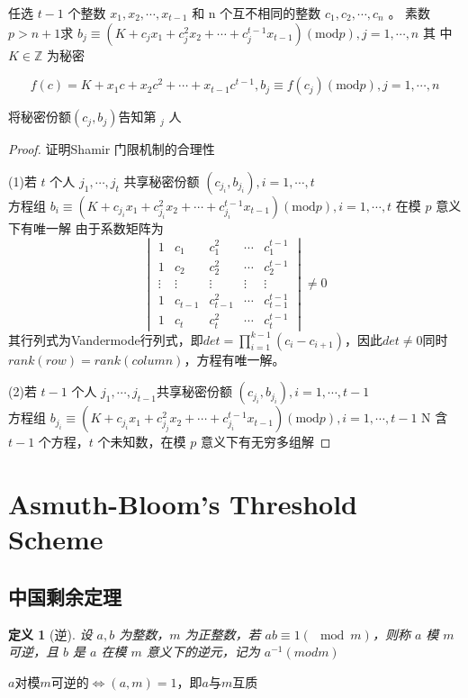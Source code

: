 \documentclass[12pt, a4paper, oneside]{ctexbook}
\newtheorem{definition}[theorem]{定义}
\begin{document}
任选 $t-1$ 个整数 $x_1,x_2,\cdots,x_{t-1}$ 和 n 个互不相同的整数 $c_1,c_2,\cdots,c_n$ 。
素数 $p>n+1$求 $b_j\equiv(K+c_jx_1+c_j^2x_2+\cdots+c_j^{t-1}x_{t-1})\left({\mathrm{mod}}p\right),j=1,\cdots,n$ 其
中 $K\in\mathbb{Z}$ 为秘密

$$f(c)=K+x_1c+x_2c^2+\cdots+x_{t-1}c^{t-1},b_j\equiv f(c_j)({\mathrm{mod}}p),j=1,\cdots,n$$

将秘密份额$\left(c_j,b_j\right)$告知第 $_j$ 人

\begin{proof}{证明Shamir 门限机制的合理性}
 
    (1)若 $t$ 个人 $j_1,\cdots,j_t$ 共享秘密份额 $(c_{j_i},b_{j_i}),i=1,\cdots,t$\\
    方程组 $b_i\equiv\left(K+c_{j_i}x_1+c_{j_i}^2x_2+\cdots+c_{j_i}^{t-1}x_{t-1}\right)\left({\mathrm{mod}}p\right),i=1,\cdots,t$ 在模 $p$ 意义下有唯一解
    由于系数矩阵为
    $$\begin{vmatrix}1&c_1&c_1^2&\cdots&c_1^{t-1}\\1&c_2&c_2^2&\cdots&c_2^{t-1}\\\vdots&\vdots&\vdots&\vdots&\vdots\\1&c_{t-1}&c_{t-1}^2&\cdots&c_{t-1}^{t-1}\\1&c_t&c_t^2&\cdots&c_t^{t-1}\end{vmatrix}\neq 0$$
    其行列式为Vandermode行列式，即$det = \prod_{i = 1}^{k-1} (c_i-c_{i+1})$，因此$det \neq 0$同时$rank(row) = rank(column)$，方程有唯一解。

    (2)若 $t-1$ 个人 $j_1,\cdots,j_{t-1}$共享秘密份额 $(c_{j_i},b_{j_i}),i=1,\cdots,t-1$\\
    方程组 $b_{j_i}\equiv(K+c_{j_i}x_1+c_{j_j}^2x_2+\cdots+c_{j_i}^{t-1}x_{t-1})({\mathrm{mod}}p),i=1,\cdots,t-1$ 
    N
    含 $t-1$ 个方程，$t$ 个未知数，在模 $p$ 意义下有无穷多组解
    
\end{proof}
\section{Asmuth-Bloom's Threshold Scheme}
\subsection{中国剩余定理}
\begin{definition}[逆]
    设 $a,b$ 为整数，$m$ 为正整数，若 $ab\equiv 1(\mod m)$，则称 $a$ 模 $m$ 可逆，且 $b$ 是 $a$ 在模 $m$ 意义下的逆元，记为 $a^{-1}(mod m)$    
\end{definition}
$a$对模$m$可逆的$\Leftrightarrow (a,m) = 1$，即$a$与$m$互质
\end{document}
